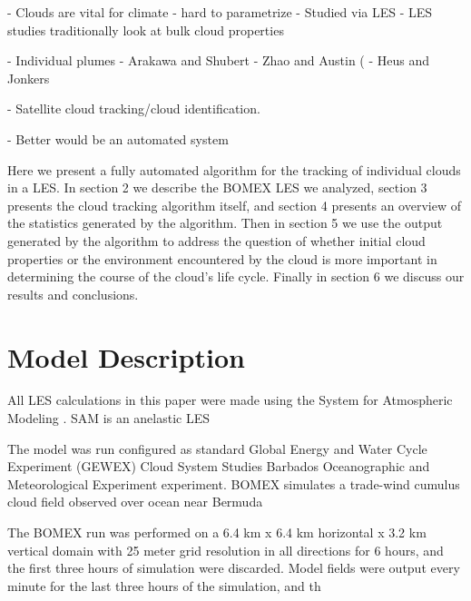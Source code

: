 \documentclass[acp]{copernicus}
\begin{document}

\introduction

- Clouds are vital for climate
- hard to parametrize
- Studied via LES
- LES studies traditionally look at bulk cloud properties

- Individual plumes
- Arakawa and Shubert
- Zhao and Austin (
- Heus and Jonkers

- Satellite cloud tracking/cloud identification.

- Better would be an automated system

Here we present a fully automated algorithm for the tracking of individual 
clouds in a LES.  In section 2 we describe the BOMEX LES we analyzed, section 
3 presents the cloud tracking algorithm itself, and section 4 presents an 
overview of the statistics generated by the algorithm.  Then in section 5 we 
use the output generated by the algorithm to address the question of whether 
initial cloud properties or the environment encountered by the cloud is more 
important in determining the course of the cloud's life cycle.  Finally in 
section 6 we discuss our results and conclusions.


\section{Model Description}

All LES calculations in this paper were made using the System for Atmospheric 
Modeling \citep[SAM;][]{Khairoutdinov2003}.  SAM is an anelastic LES 

The model was run configured as standard Global Energy and Water Cycle 
Experiment (GEWEX) Cloud System Studies \citep[GCSS;][]{Randall2003} Barbados 
Oceanographic and Meteorological Experiment \citep[BOMEX;][]{Siebesma2003} 
experiment.  BOMEX simulates a trade-wind cumulus cloud field observed over 
ocean near Bermuda

The BOMEX run was performed on a 6.4 km x 6.4 km horizontal x 3.2 km vertical 
domain with 25 meter grid resolution in all directions for 6 hours, and the 
first three hours of simulation were discarded.  Model fields were output every 
minute for the last three hours of the simulation, and th

\end{document}
